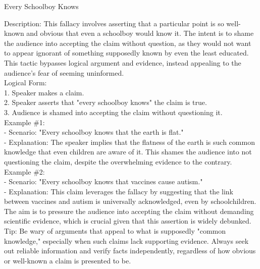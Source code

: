 \documentclass[a4paper,12pt,single,pdftex]{scrartcl}
\begin{document}
Every Schoolboy Knows
    
      Description: This fallacy involves asserting that a particular point is so well-known and obvious that even a schoolboy would know it. The intent is to shame the audience into accepting the claim without question, as they would not want to appear ignorant of something supposedly known by even the least educated. This tactic bypasses logical argument and evidence, instead appealing to the audience's fear of seeming uninformed.
    \\

    
      Logical Form:
    \\

    
        1. Speaker makes a claim.
    \\

    
        2. Speaker asserts that "every schoolboy knows" the claim is true.
    \\

    
        3. Audience is shamed into accepting the claim without questioning it.
    \\

    
      Example \#1:
    \\

    
        - Scenario: "Every schoolboy knows that the earth is flat."
    \\

    
        - Explanation: The speaker implies that the flatness of the earth is such common knowledge that even children are aware of it. This shames the audience into not questioning the claim, despite the overwhelming evidence to the contrary.
    \\

    
      Example \#2:
    \\

    
        - Scenario: "Every schoolboy knows that vaccines cause autism."
    \\

    
        - Explanation: This claim leverages the fallacy by suggesting that the link between vaccines and autism is universally acknowledged, even by schoolchildren. The aim is to pressure the audience into accepting the claim without demanding scientific evidence, which is crucial given that this assertion is widely debunked.
    \\

    
      Tip: Be wary of arguments that appeal to what is supposedly "common knowledge," especially when such claims lack supporting evidence. Always seek out reliable information and verify facts independently, regardless of how obvious or well-known a claim is presented to be.
    \\
\end{document}
